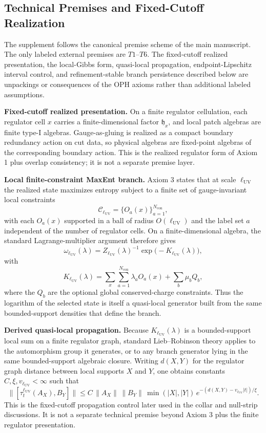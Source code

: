 \subsection{Technical Premises and Fixed-Cutoff Realization}\label{12-regulator-premises}

The supplement follows the canonical premise scheme of the main manuscript. The only labeled external premises are \(T1\)--\(T6\). The fixed-cutoff realized presentation, the local-Gibbs form, quasi-local propagation, endpoint-Lipschitz interval control, and refinement-stable branch persistence described below are unpackings or consequences of the OPH axioms rather than additional labeled assumptions.

\textbf{Fixed-cutoff realized presentation.} On a finite regulator cellulation, each regulator cell \(x\) carries a finite-dimensional factor \(\mathfrak h_x\), and local patch algebras are finite type-I algebras. Gauge-as-gluing is realized as a compact boundary redundancy action on cut data, so physical algebras are fixed-point algebras of the corresponding boundary action. This is the realized regulator form of Axiom 1 plus overlap consistency; it is not a separate premise layer.

\textbf{Local finite-constraint MaxEnt branch.} Axiom 3 states that at scale \(\ell_{\mathrm{UV}}\) the realized state maximizes entropy subject to a finite set of gauge-invariant local constraints
\[
\mathcal C_{\ell_{\mathrm{UV}}}=\{O_a(x)\}_{a=1}^{N_{\mathrm{con}}},
\]
with each \(O_a(x)\) supported in a ball of radius \(O(\ell_{\mathrm{UV}})\) and the label set \(a\) independent of the number of regulator cells. On a finite-dimensional algebra, the standard Lagrange-multiplier argument therefore gives
\[
\omega_{\ell_{\mathrm{UV}}}(\lambda)
=
Z_{\ell_{\mathrm{UV}}}(\lambda)^{-1}
\exp\!\bigl(-K_{\ell_{\mathrm{UV}}}(\lambda)\bigr),
\]
with
\[
K_{\ell_{\mathrm{UV}}}(\lambda)
=
\sum_x \sum_{a=1}^{N_{\mathrm{con}}}\lambda_a O_a(x)
+\sum_b \mu_b Q_b,
\]
where the \(Q_b\) are the optional global conserved-charge constraints. Thus the logarithm of the selected state is itself a quasi-local generator built from the same bounded-support densities that define the branch.

\textbf{Derived quasi-local propagation.} Because \(K_{\ell_{\mathrm{UV}}}(\lambda)\) is a bounded-support local sum on a finite regulator graph, standard Lieb--Robinson theory applies to the automorphism group it generates, or to any branch generator lying in the same bounded-support algebraic closure. Writing \(d(X,Y)\) for the regulator graph distance between local supports \(X\) and \(Y\), one obtains constants \(C,\xi,v_{\ell_{\mathrm{UV}}}<\infty\) such that
\[
\bigl\|[\tau_t^{\ell_{\mathrm{UV}}}(A_X),B_Y]\bigr\|
\le
C\,\|A_X\|\,\|B_Y\|\,\min(|X|,|Y|)\,
e^{-(d(X,Y)-v_{\ell_{\mathrm{UV}}}|t|)/\xi}.
\]
This is the fixed-cutoff propagation control later used in the collar and null-strip discussions. It is not a separate technical premise beyond Axiom 3 plus the finite regulator presentation.

